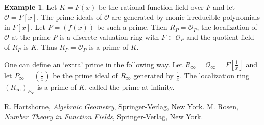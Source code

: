 \documentclass[12pt]{article}
\theoremstyle{definition}
\newtheorem{exa}{Example}
\begin{document}
\begin{exa}
Let $K=F(x)$ be the rational function field over $F$ and let $\mathcal{O}=F[x]$. The prime ideals of $\mathcal{O}$ are generated by monic irreducible polynomials in $F[x]$. Let $P=(f(x))$ be such a prime. Then $R_P=\mathcal{O}_P$, the localization of $\mathcal{O}$ at the prime $P$ is a discrete valuation ring with $F\subset \mathcal{O}_P$ and the quotient field of $R_P$ is $K$. Thus $R_P=\mathcal{O}_P$ is a prime of $K$.

One can define an `extra' prime in the following way. Let $R_\infty=\mathcal{O}_\infty=F[\frac{1}{x}]$ and let $P_\infty=(\frac{1}{x})$ be the prime ideal of $R_\infty$ generated by $\frac{1}{x}$. The localization ring $(R_\infty)_{P_\infty}$ is a prime of $K$, called the prime at infinity.
\end{exa}

\begin{thebibliography}{00}
 R. Hartshorne, {\em Algebraic Geometry}, Springer-Verlag, New York.
 M. Rosen, {\em Number Theory in Function Fields}, Springer-Verlag, New York.
\end{thebibliography}
\end{document}
